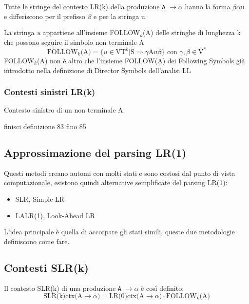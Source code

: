 Tutte le stringe del contesto LR(k) della produzione \texttt{A} $\rightarrow \alpha$ hanno la forma $\beta\alpha$u e differiscono per il prefisso $\beta$ e per la stringa u.

\begin{mdframed}[topline=false,bottomline=false,rightline=false]
La stringa \textit{u} appartiene all'insieme FOLLOW$_k$(A) delle stringhe di lunghezza k che possono seguire il simbolo non terminale A
\begin{equation*}
    \text{FOLLOW}_k\text{(A)} = \{ \textit{u} \in \text{VT}^k | \text{S} \Rightarrow \gamma \text{A}\textit{u}\beta \} \text{ con }\gamma, \beta \in \text{V}^*
\end{equation*}
FOLLOW$_k$(A) non è altro che l'insieme FOLLOW(A) dei Following Symbols già introdotto nella definizione di Director Symbols dell'analisi LL
\end{mdframed}

\subsubsection{Contesti sinistri LR(k)}
\begin{mdframed}[topline=false,bottomline=false,rightline=false]
Contesto sinistro di un non terminale A:
\end{mdframed}
finisci definizione 83 fino 85

\subsection{Approssimazione del parsing LR(1)}
Questi metodi creano automi con molti stati e sono costosi dal punto di vista computazionale, esistono quindi alternative semplificate del parsing LR(1):
\begin{itemize}
    \item SLR, Simple LR
    \item LALR(1), Look-Ahead LR
\end{itemize}

L'idea principale è quella di accorpare gli stati simili, queste due metodologie definiscono come fare.

\subsection{Contesti SLR(k)}
\begin{mdframed}[topline=false,bottomline=false,rightline=false]
Il contesto SLR(k) di una produzione \texttt{A} $\rightarrow \alpha$ è così definito:
\begin{equation*}
\text{SLR(k)ctx(A} \rightarrow \alpha ) = \text{LR(0)ctx(A} \rightarrow \alpha ) \cdot \text{FOLLOW}_k\text{(A)}
\end{equation*}
\end{mdframed}

